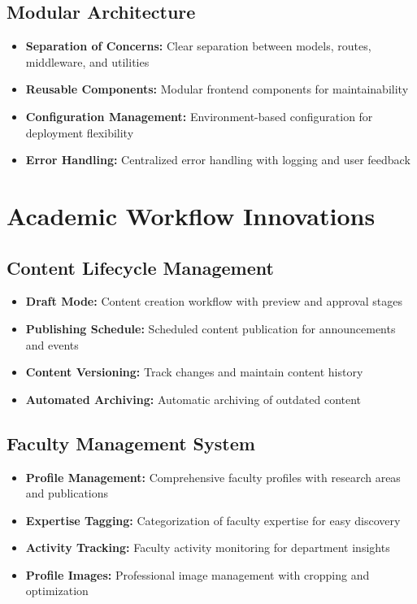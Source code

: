 \documentclass[12pt,a4paper]{report}
\begin{document}
\subsection{Modular Architecture}
\begin{itemize}
    \item \textbf{Separation of Concerns:} Clear separation between models, routes, middleware, and utilities
    \item \textbf{Reusable Components:} Modular frontend components for maintainability
    \item \textbf{Configuration Management:} Environment-based configuration for deployment flexibility
    \item \textbf{Error Handling:} Centralized error handling with logging and user feedback
\end{itemize}

\section{Academic Workflow Innovations}

\subsection{Content Lifecycle Management}
\begin{itemize}
    \item \textbf{Draft Mode:} Content creation workflow with preview and approval stages
    \item \textbf{Publishing Schedule:} Scheduled content publication for announcements and events
    \item \textbf{Content Versioning:} Track changes and maintain content history
    \item \textbf{Automated Archiving:} Automatic archiving of outdated content
\end{itemize}

\subsection{Faculty Management System}
\begin{itemize}
    \item \textbf{Profile Management:} Comprehensive faculty profiles with research areas and publications
    \item \textbf{Expertise Tagging:} Categorization of faculty expertise for easy discovery
    \item \textbf{Activity Tracking:} Faculty activity monitoring for department insights
    \item \textbf{Profile Images:} Professional image management with cropping and optimization
\end{itemize}
\end{document}
